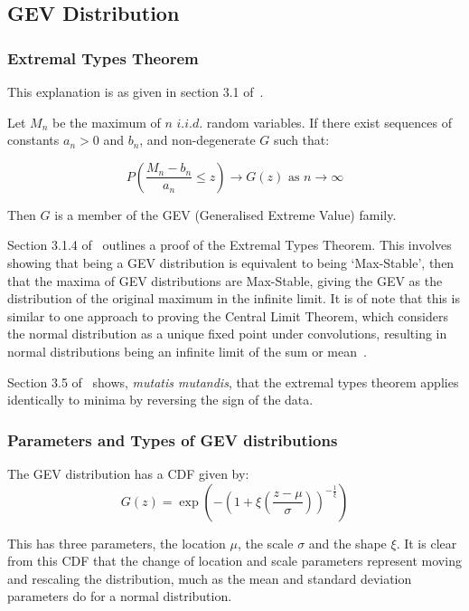 \documentclass[12pt,a4paper]{report}
\begin{document}
\subsection{GEV Distribution}\label{subsec:gev}

\subsubsection{Extremal Types Theorem}

This explanation is as given in section 3.1 of~\cite{Coles_2001}.

Let $M_n$ be the maximum of $n$ $i.i.d.$ random variables.
If there exist sequences of constants $a_n > 0$ and $b_n$, and non-degenerate $G$ such that:

\[ P\left( \frac{M_n - b_n}{a_n}  \leq z \right) \rightarrow G(z) \text{ as } n \rightarrow \infty \]

Then $G$ is a member of the GEV (Generalised Extreme Value) family.

Section 3.1.4  of~\cite{Coles_2001} outlines a proof of the Extremal Types Theorem.
This involves showing that being a GEV distribution is equivalent to being `Max-Stable',
    then that the maxima of GEV distributions are Max-Stable,
    giving the GEV as the distribution of the original maximum in the infinite limit.
It is of note that this is similar to one approach to proving the Central Limit Theorem,
    which considers the normal distribution as a unique fixed point under convolutions,
    resulting in normal distributions being an infinite limit of the sum or mean~\cite{Hamedani_Walter_1984}.

Section 3.5 of~\cite{Coles_2001} shows, \textit{mutatis mutandis},
    that the extremal types theorem applies identically to minima by reversing the sign of the data.

\subsubsection{Parameters and Types of GEV distributions}

The GEV distribution has a CDF given by:
\begin{equation}\label{eq:gevcdf}
    G(z) = \exp \left( - \left( 1 + \xi \left( \frac{z-\mu}{\sigma} \right)  \right)^{-\frac{1}{\xi}} \right)
\end{equation}

This has three parameters, the location $\mu$, the scale $\sigma$ and the shape $\xi$.
It is clear from this CDF that the change of location and scale parameters represent moving and rescaling the distribution,
    much as the mean and standard deviation parameters do for a normal distribution.
\end{document}
